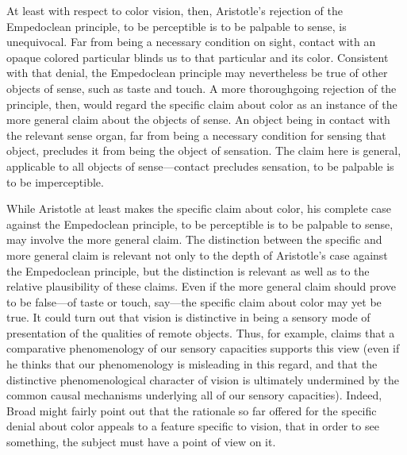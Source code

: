 At least with respect to color vision, then, Aristotle's rejection of the Empedoclean principle, to be perceptible is to be palpable to sense, is unequivocal. Far from being a necessary condition on sight, contact with an opaque colored particular blinds us to that particular and its color. Consistent with that denial, the Empedoclean principle may nevertheless be true of other objects of sense, such as taste and touch. A more thoroughgoing rejection of the principle, then, would regard the specific claim about color as an instance of the more general claim about the objects of sense. An object being in contact with the relevant sense organ, far from being a necessary condition for sensing that object, precludes it from being the object of sensation. The claim here is general, applicable to all objects of sense---contact precludes sensation, to be palpable is to be imperceptible.

While Aristotle at least makes the specific claim about color, his complete case against the Empedoclean principle, to be perceptible is to be palpable to sense, may involve the more general claim. The distinction between the specific and more general claim is relevant not only to the depth of Aristotle's case against the Empedoclean principle, but the distinction is relevant as well as to the relative plausibility of these claims. Even if the more general claim should prove to be false---of taste or touch, say---the specific claim about color may yet be true. It could turn out that vision is distinctive in being a sensory mode of presentation of the qualities of remote objects. Thus, for example, \citet[]{Broad:1952kx} claims that a comparative phenomenology of our sensory capacities supports this view (even if he thinks that our phenomenology is misleading in this regard, and that the distinctive phenomenological character of vision is ultimately undermined by the common causal mechanisms underlying all of our sensory capacities). Indeed, Broad might fairly point out that the rationale so far offered for the specific denial about color appeals to a feature specific to vision, that in order to see something, the subject must have a point of view on it.

